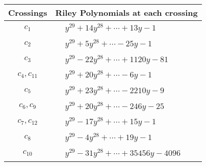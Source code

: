 \documentclass[1p]{elsarticle_modified}
\theoremstyle{definition}
\begin{document}
\begin{tabular}{m{50pt}|m{274pt}}
Crossings & \hspace{64pt}Riley Polynomials at each crossing \\
\hline $$\begin{aligned}c_{1}\end{aligned}$$&$\begin{aligned}
&y^{29}+14 y^{28}+\cdots+13 y-1
\end{aligned}$\\
\hline $$\begin{aligned}c_{2}\end{aligned}$$&$\begin{aligned}
&y^{29}+5 y^{28}+\cdots-25 y-1
\end{aligned}$\\
\hline $$\begin{aligned}c_{3}\end{aligned}$$&$\begin{aligned}
&y^{29}-22 y^{28}+\cdots+1120 y-81
\end{aligned}$\\
\hline $$\begin{aligned}c_{4},c_{11}\end{aligned}$$&$\begin{aligned}
&y^{29}+20 y^{28}+\cdots-6 y-1
\end{aligned}$\\
\hline $$\begin{aligned}c_{5}\end{aligned}$$&$\begin{aligned}
&y^{29}+23 y^{28}+\cdots-2210 y-9
\end{aligned}$\\
\hline $$\begin{aligned}c_{6},c_{9}\end{aligned}$$&$\begin{aligned}
&y^{29}+20 y^{28}+\cdots-246 y-25
\end{aligned}$\\
\hline $$\begin{aligned}c_{7},c_{12}\end{aligned}$$&$\begin{aligned}
&y^{29}-17 y^{28}+\cdots+15 y-1
\end{aligned}$\\
\hline $$\begin{aligned}c_{8}\end{aligned}$$&$\begin{aligned}
&y^{29}-4 y^{28}+\cdots+19 y-1
\end{aligned}$\\
\hline $$\begin{aligned}c_{10}\end{aligned}$$&$\begin{aligned}
&y^{29}-31 y^{28}+\cdots+35456 y-4096
\end{aligned}$\\
\hline
\end{tabular}\\~\\
\end{document}
